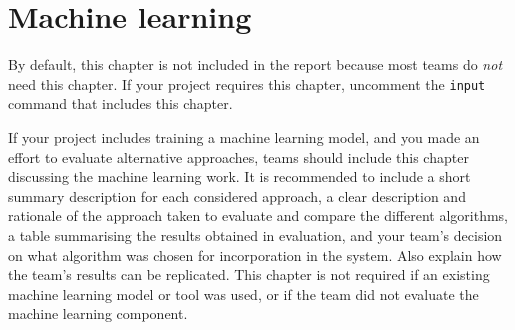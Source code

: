 \chapter{Machine learning}
\label{chap:machine-learning}


\begin{instructions}
By default, this chapter is not included in the report because most teams do \emph{not} need this chapter.  If your project requires this chapter, uncomment the \texttt{input} command that includes this chapter.
\end{instructions}

\begin{expectations}
If your project includes training a machine learning model, and you made an effort to evaluate alternative  approaches, teams should include this chapter discussing the machine learning work.  It is recommended to  include a short summary description for each considered approach, a clear description and rationale of the  approach taken to evaluate and compare the different algorithms, a table summarising the results obtained in evaluation, and your team's decision on what algorithm was chosen for incorporation in the system.  Also  explain how the team's results can be replicated.  This chapter is not required if an existing machine learning model or tool was used, or if the team did not evaluate the machine learning component.
\end{expectations}